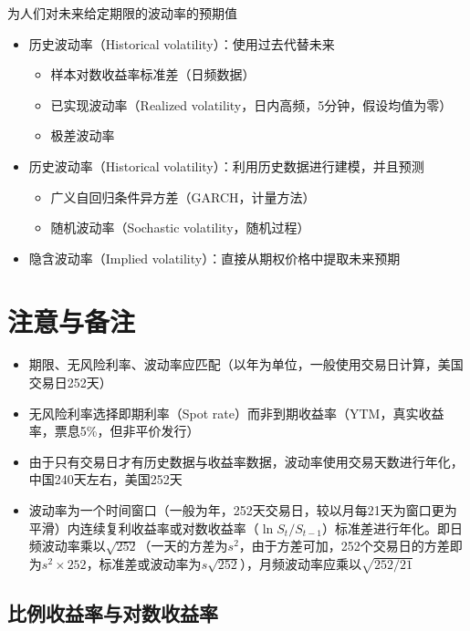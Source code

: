 \documentclass[11pt]{article}
\begin{document}
为人们对未来给定期限的波动率的预期值
\begin{itemize}
    \item 历史波动率（Historical volatility）：使用过去代替未来
          \begin{itemize}
              \item 样本对数收益率标准差（日频数据）
              \item 已实现波动率（Realized volatility，日内高频，5分钟，假设均值为零）
              \item 极差波动率
          \end{itemize}
    \item 历史波动率（Historical volatility）：利用历史数据进行建模，并且预测
          \begin{itemize}
              \item 广义自回归条件异方差（GARCH，计量方法）
              \item 随机波动率（Sochastic volatility，随机过程）
          \end{itemize}
    \item 隐含波动率（Implied volatility）：直接从期权价格中提取未来预期
\end{itemize}

\section{注意与备注}

\begin{itemize}
    \item 期限、无风险利率、波动率应匹配（以年为单位，一般使用交易日计算，美国交易日252天）
    \item 无风险利率选择即期利率（Spot rate）而非到期收益率（YTM，真实收益率，票息5\%，但非平价发行）
    \item 由于只有交易日才有历史数据与收益率数据，波动率使用交易天数进行年化，中国240天左右，美国252天
    \item 波动率为一个时间窗口（一般为年，252天交易日，较以月每21天为窗口更为平滑）内连续复利收益率或对数收益率（$\ln S_t/S_{t-1}$）标准差进行年化。即日频波动率乘以$\sqrt{252}$（一天的方差为$s^2$，由于方差可加，252个交易日的方差即为$s^2 \times 252$，标准差或波动率为$s\sqrt{252}$），月频波动率应乘以$\sqrt{252/21}$
\end{itemize}

\subsection{比例收益率与对数收益率}
\end{document}

